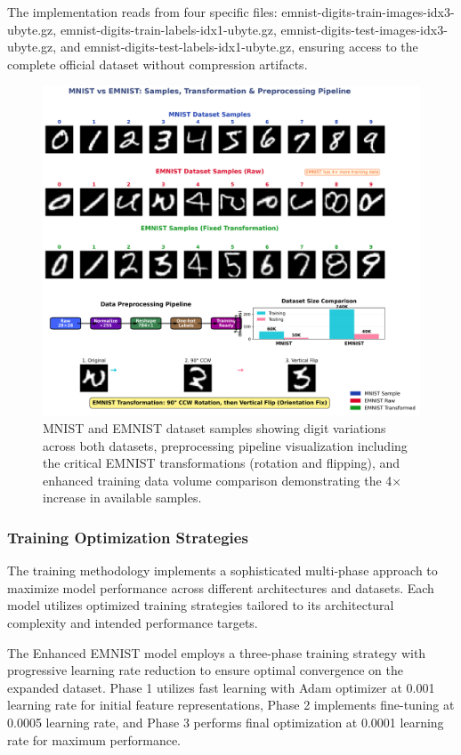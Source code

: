 \documentclass[11pt,a4paper]{report}
\begin{document}
The implementation reads from four specific files: emnist-digits-train-images-idx3-ubyte.gz, emnist-digits-train-labels-idx1-ubyte.gz, emnist-digits-test-images-idx3-ubyte.gz, and emnist-digits-test-labels-idx1-ubyte.gz, ensuring access to the complete official dataset without compression artifacts.

\begin{figure}[H]
\centering
\includegraphics[width=\textwidth]{digit_recognizer_dataset_samples.png}
\caption{MNIST and EMNIST dataset samples showing digit variations across both datasets, preprocessing pipeline visualization including the critical EMNIST transformations (rotation and flipping), and enhanced training data volume comparison demonstrating the 4× increase in available samples.}
\label{fig:digit_dataset}
\end{figure}

\subsubsection{Training Optimization Strategies}

The training methodology implements a sophisticated multi-phase approach to maximize model performance across different architectures and datasets. Each model utilizes optimized training strategies tailored to its architectural complexity and intended performance targets.

The Enhanced EMNIST model employs a three-phase training strategy with progressive learning rate reduction to ensure optimal convergence on the expanded dataset. Phase 1 utilizes fast learning with Adam optimizer at 0.001 learning rate for initial feature representations, Phase 2 implements fine-tuning at 0.0005 learning rate, and Phase 3 performs final optimization at 0.0001 learning rate for maximum performance.
\end{document}
